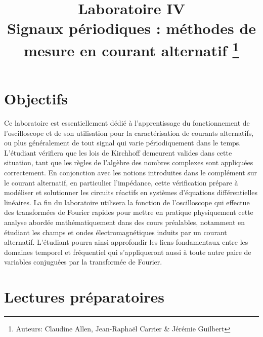 \documentclass[canadien,12pt,oneside,letterpaper]{article}
\title{\textbf{Laboratoire IV}\\Signaux périodiques : méthodes de mesure en courant alternatif \thanks{Auteurs: Claudine Allen, Jean-Raphaël Carrier \& Jérémie Guilbert}}
\date{}
\begin{document}
\maketitle \vspace{-1cm}

\section{Objectifs}

Ce laboratoire est essentiellement dédié à l’apprentissage du fonctionnement de l’oscilloscope et de son utilisation pour la caractérisation de courants alternatifs, ou plus généralement de tout signal qui varie périodiquement dans le temps. L’étudiant vérifiera que les lois de Kirchhoff demeurent valides dans cette situation, tant que les règles de l’algèbre des nombres complexes sont appliquées correctement. En conjonction avec les notions introduites dans le complément sur le courant alternatif, en particulier l’impédance, cette vérification prépare à modéliser et solutionner les circuits réactifs en systèmes d’équations différentielles linéaires. La fin du laboratoire utilisera la fonction de l’oscilloscope qui effectue des transformées de Fourier rapides pour mettre en pratique physiquement cette analyse abordée mathématiquement dans des cours préalables, notamment en étudiant les champs et ondes électromagnétiques induits par un courant alternatif. L’étudiant pourra ainsi approfondir les liens fondamentaux entre les domaines temporel et fréquentiel qui s’appliqueront aussi à toute autre paire de variables conjuguées par la transformée de Fourier.

\section[Lectures préparatoires]{Lectures préparatoires} \label{sec:prep}
\end{document}
